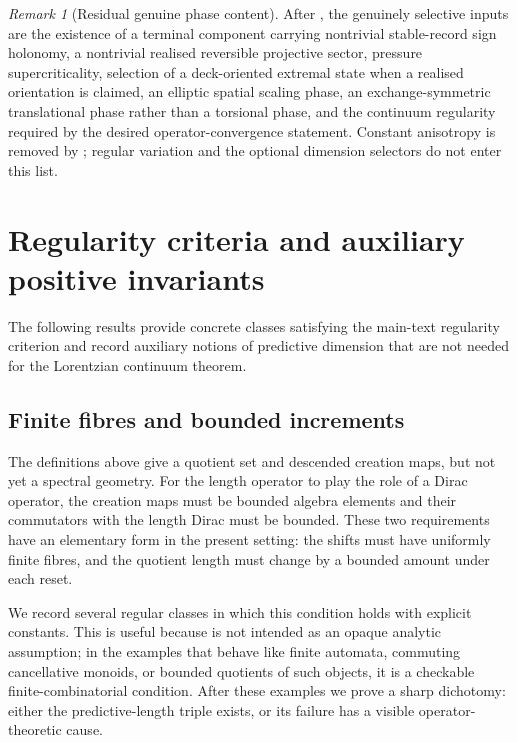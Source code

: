 \documentclass[11pt]{article}
\theoremstyle{definition}
\theoremstyle{remark}
\newtheorem{remark}[theorem]{Remark}
\begin{document}
\begin{remark}[Residual genuine phase content]
\label{rem:residual-phase-content}
After , the genuinely selective inputs
are the existence of a terminal component carrying nontrivial stable-record
sign holonomy, a nontrivial realised reversible projective sector, pressure
supercriticality, selection of a deck-oriented extremal state when a realised
orientation is claimed, an elliptic spatial scaling phase, an
exchange-symmetric translational phase rather than a torsional phase, and the
continuum regularity required by the desired operator-convergence statement.
Constant anisotropy is removed by ; regular
variation and the optional dimension selectors do not enter this list.
\end{remark}

\section{Regularity criteria and auxiliary positive invariants}
\label{app:regularity-positive}

The following results provide concrete classes satisfying the main-text
regularity criterion and record auxiliary notions of predictive dimension that
are not needed for the Lorentzian continuum theorem.

\subsection{Finite fibres and bounded increments}
\label{subsec:fibre-criteria}

The definitions above give a quotient set and descended creation maps, but not
yet a spectral geometry.  For the length operator to play the role of a Dirac
operator, the creation maps must be bounded algebra elements and their
commutators with the length Dirac must be bounded.  These two requirements have
an elementary form in the present setting: the shifts must have uniformly finite
fibres, and the quotient length must change by a bounded amount under each
reset.

We record several regular classes in which this condition holds with explicit
constants.  This is useful because  is not intended as an
opaque analytic assumption; in the examples that behave like finite automata,
commuting cancellative monoids, or bounded quotients of such objects, it is a
checkable finite-combinatorial condition.  After these examples we prove a sharp
dichotomy: either the predictive-length triple exists, or its failure has a
visible operator-theoretic cause.
\end{document}
